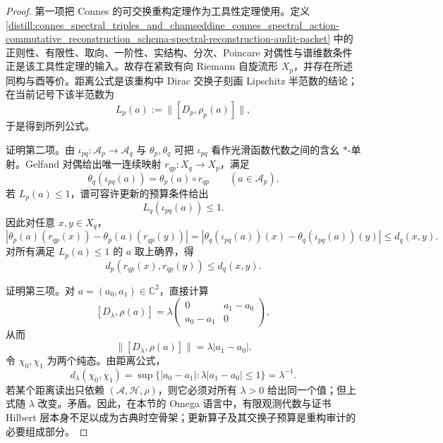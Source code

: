 \begin{proof}
第一项把 Connes 的可交换重构定理作为工具性定理使用。定义 \ref{distill:connes_spectral_triples_and_chamseddine_connes_spectral_action-commutative_reconstruction_schema-spectral-reconstruction-audit-packet} 中的正则性、有限性、取向、一阶性、实结构、分次、Poincare 对偶性与谱维数条件正是该工具性定理的输入。故存在紧致有向 Riemann 自旋流形 \(X_p\)，并存在所述同构与酉等价。距离公式是该重构中 Dirac 交换子刻画 Lipschitz 半范数的结论；在当前记号下该半范数为
\[
L_p(a):=\bigl\|[D_p,\rho_p(a)]\bigr\|,
\]
于是得到所列公式。

证明第二项。由 \(\iota_{pq}:\mathcal A_p\to\mathcal A_q\) 与 \(\theta_p,\theta_q\) 可把 \(\iota_{pq}\) 看作光滑函数代数之间的含幺 \(*\)-单射。Gelfand 对偶给出唯一连续映射 \(r_{qp}:X_q\to X_p\)，满足
\[
\theta_q(\iota_{pq}(a))=\theta_p(a)\circ r_{qp}
\qquad(a\in\mathcal A_p).
\]
若 \(L_p(a)\le 1\)，谱可容许更新的预算条件给出
\[
L_q(\iota_{pq}(a))\le 1.
\]
因此对任意 \(x,y\in X_q\)，
\[
|\theta_p(a)(r_{qp}(x))-\theta_p(a)(r_{qp}(y))|
=
|\theta_q(\iota_{pq}(a))(x)-\theta_q(\iota_{pq}(a))(y)|
\le d_q(x,y).
\]
对所有满足 \(L_p(a)\le 1\) 的 \(a\) 取上确界，得
\[
d_p(r_{qp}(x),r_{qp}(y))\le d_q(x,y).
\]

证明第三项。对 \(a=(a_0,a_1)\in\mathbb C^2\)，直接计算
\[
[D_\lambda,\rho(a)]
=\lambda
\begin{pmatrix}
0&a_1-a_0\\
a_0-a_1&0
\end{pmatrix},
\]
从而
\[
\bigl\|[D_\lambda,\rho(a)]\bigr\|=\lambda |a_1-a_0|.
\]
令 \(\chi_0,\chi_1\) 为两个纯态。由距离公式，
\[
d_\lambda(\chi_0,\chi_1)
=\sup\{|a_0-a_1|:\lambda |a_1-a_0|\le 1\}
=\lambda^{-1}.
\]
若某个距离读出只依赖 \((\mathcal A,\mathcal H,\rho)\)，则它必须对所有 \(\lambda>0\) 给出同一个值；但上式随 \(\lambda\) 改变。矛盾。因此，在本节的 Omega 语言中，有限观测代数与证书 Hilbert 层本身不足以成为古典时空骨架；更新算子及其交换子预算是重构审计的必要组成部分。
\end{proof}

